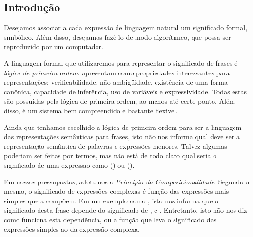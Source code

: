 
\subsection{Introdução}

Desejamos associar a cada expressão de linguagem natural um significado formal, simbólico. Além disso, desejamos fazê-lo de modo algorítmico, que possa ser reproduzido por um computador.

A linguagem formal que utilizaremos para representar o significado de frases é \textit{lógica de primeira ordem}. \citet{Jurafsky:2009} apresentam como propriedades interessantes para representações: verificabilidade, não-ambigüidade, existência de uma forma canônica, capacidade de inferência, uso de variáveis e expressividade. Todas estas são possuídas pela lógica de primeira ordem, ao menos até certo ponto. Além disso, é um sistema bem compreendido e bastante flexível.


Ainda que tenhamos escolhido a lógica de primeira ordem para ser a linguagem das representações semânticas para frases, isto não nos informa qual deve ser a representação semântica de palavras e expressões menores. Talvez algumas poderiam ser feitas por termos, mas não está de todo claro qual seria o significado de uma expressão como  () ou  ().

Em nossos pressupostos, adotamos o \textit{Princípio da Composicionalidade}. Segundo o mesmo, o significado de expressões complexas é função das expressões mais simples que a compõem. Em um exemplo como , isto nos informa que o significado desta frase depende do significado de ,  e . Entretanto, isto não nos diz como funciona esta dependência, ou a função que leva o significado das expressões simples ao da expressão complexa.

